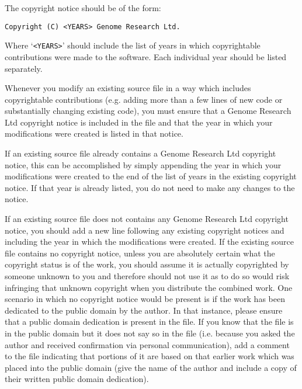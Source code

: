 \documentclass[10pt,a4paper]{article}
\begin{document}
\par The copyright notice should be of the form: 
\begin{verbatim}
Copyright (C) <YEARS> Genome Research Ltd.
\end{verbatim}

\par Where `\texttt{<YEARS>}' should include the list of years in which copyrightable 
contributions \cite{define:copyrightable} were made to the software. Each individual 
year should be listed separately. 

\par Whenever you modify an existing source file in a way which includes copyrightable 
contributions (e.g. adding more than a few lines of new code or substantially changing 
existing code), you must ensure that a Genome Research Ltd copyright notice is 
included in the file and that the year in which your modifications were created is 
listed in that notice. 

\par If an existing source file already contains a Genome Research Ltd copyright notice, this can be 
accomplished by simply appending the year in which your modifications were created 
to the end of the list of years in the existing copyright notice. If that year is already 
listed, you do not need to make any changes to the notice. 

\par If an existing source file does not contains any Genome Research Ltd copyright 
notice, you should add a new line following any existing copyright notices and 
including the year in which the modifications were created. If the existing source 
file contains no copyright notice, unless you are absolutely certain what the 
copyright status is of the work, you should assume it is actually copyrighted by 
someone unknown to you and therefore should not use it as to do so would risk 
infringing that unknown copyright when you distribute the combined work. One 
scenario in which no copyright notice would be present is if the work has been 
dedicated to the public domain by the author. In that instance, please ensure 
that a public domain dedication is present in the file. If you know 
that the file is in the public domain but it does not say so in the file (i.e. because 
you asked the author and received confirmation via personal communication), 
add a comment to the file indicating that portions of it are based on that earlier 
work which was placed into the public domain (give the name of the author and 
include a copy of their written public domain dedication). 
\end{document}
